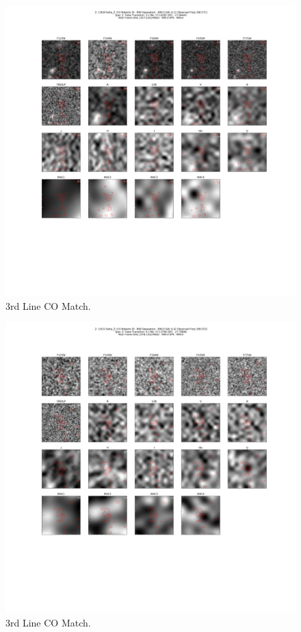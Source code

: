 \begin{figure}[tbp]
\centering \includegraphics[width=120mm]{Matched/ASPECS_Cutout_21.png}
\caption{3rd Line CO Match.}
\label{fig:Match_Three}
\end{figure}

\begin{figure}[tbp]
\centering \includegraphics[width=120mm]{Matched/ASPECS_Cutout_22.png}
\caption{3rd Line CO Match.}
\label{fig:Match_Three}
\end{figure}

